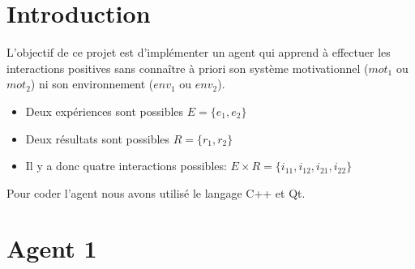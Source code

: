 \documentclass[11pt]{article}
\author{\fontsize{14}{14}{\bf Aurélien CHEMIER, Arnaud DUHAMEL, Maëlyss FARGES}}
\title{\fontsize{16}{16}{{\bf Rapport MIF24}}}
\date{\fontsize{11}{11}{2013/2014}}
\begin{document}
  \thispagestyle{empty}
  \maketitle
  \newpage
  \tableofcontents
  
  
  \newpage

  \section{Introduction}
    L'objectif de ce projet est d'implémenter un agent qui apprend à effectuer les interactions positives sans connaître à priori 
  son système motivationnel (\begin{math} mot_1 \end{math} ou \begin{math} mot_2 \end{math}) ni son environnement 
  (\begin{math}env_1\end{math} ou \begin{math}env_2\end{math}).
  
  
  \begin{itemize}
    \item Deux expériences sont possibles \begin{math} E = \{e_1,e_2\}\end{math}
    \item Deux résultats sont possibles \begin{math} R = \{r_1,r_2\} \end{math}
    \item Il y a donc quatre interactions possibles: \begin{math} E\times R=\{i_{11},i_{12},i_{21},i_{22}\}\end{math}
    
  \end{itemize}

    Pour coder l'agent nous avons utilisé le langage C++ et Qt.
    
  \section{Agent 1}
\end{document}
